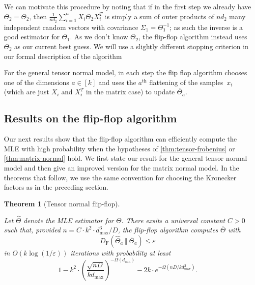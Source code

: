 \documentclass[aos]{imsart}
\newtheorem{theorem}{Theorem}[section]
\theoremstyle{definition}
\numberwithin{equation}{section}
\newcommand{\otheta}{\overline{\Theta}}
\newcommand{\htheta}{\widehat{\Theta}}
\newcommand{\eps}{\varepsilon}
\newcommand{\DF}{D_{\operatorname{F}}}
\def\dmin{d_{\min}}
\def\dmax{d_{\max}}
\begin{document}
We can motivate this procedure by noting that if in the first step we already have $\overline{\Theta}_2 = \Theta_2$, then $\frac{1}{n d_2} \sum_{i = 1}^n X_i \overline{\Theta}_2 X_i^T$ is simply a sum of outer products of $nd_2$ many independent random vectors with covariance $\Sigma_1 = \Theta_1^{-1}$; as such the inverse is a good estimator for $\Theta_1$.
As we don't know $\Theta_2$, the flip-flop algorithm instead uses $\overline{\Theta}_2$ as our current best guess. We will use a slightly different stopping criterion in our formal description of the algorithm

For the general tensor normal model, in each step the flip flop algorithm chooses one of the dimensions $a \in [k]$ and uses the $a^\text{th}$ flattening of the samples~$x_i$ (which are just $X_i$ and $X_i^T$ in the matrix case) to update $\overline{\Theta}_a$.
\subsection{Results on the flip-flop algorithm}
Our next results show that the flip-flop algorithm can efficiently compute the MLE with high probability when the hypotheses of \cref{thm:tensor-frobenius} or \cref{thm:matrix-normal} hold.
We first state our result for the general tensor normal model and then give an improved version for the matrix normal model.
In the theorems that follow, we use the same convention for choosing the Kronecker factors as in the preceding section.

\newcommand{\TensorFlop}{
	Let $\htheta$ denote the MLE estimator for $\Theta$. There exsits a universal constant $C > 0$ such that,  provided $n = C \cdot k^2 \cdot \dmax^3/D$, the flip-flop algorithm computes $\otheta$ with
	$$ \DF(\htheta_a \ \Vert  \ \otheta_a) \leq \eps $$
	in $O(k \log(1/\eps))$ iterations with probability at least
	$$ 1 - k^2 \cdot \left( \dfrac{\sqrt{nD}}{k \dmax} \right)^{-\Omega(\dmin)} - 2k \cdot e^{- \Omega(nD/k \dmax^2)}.$$}

\begin{theorem}[Tensor normal flip-flop]\label{thm:tensor-flipflop}
\TensorFlop
\end{theorem}
\end{document}
